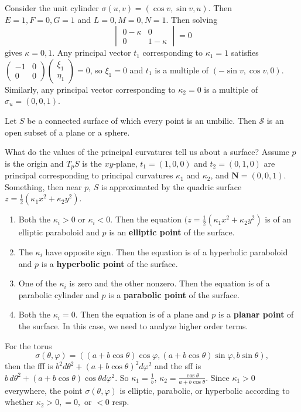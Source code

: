 \begin{example}
    Consider the unit cylinder $\sigma(u,v)=(\cos v, \sin v, u)$. Then $E=1,F=0,G=1$ and  $L=0,M=0,N=1$. Then solving \[
    \begin{vmatrix}
        0-\kappa & 0 \\ 0 & 1-\kappa
    \end{vmatrix}=0
\] gives $\kappa=0,1$. Any principal vector $t_1$ corresponding to $\kappa_1=1$ satisfies $\left( 
\begin{smallmatrix}
    -1 & 0 \\ 0 & 0
\end{smallmatrix}\right) \left( 
\begin{smallmatrix}
    \xi_1 \\ \eta_1
\end{smallmatrix}\right) =0$, so $\xi_1=0$ and $t_1$ is a multiple of $(-\sin v, \cos v, 0)$. Similarly, any principal vector corresponding to $\kappa_2=0$ is a multiple of $\sigma_u=(0,0,1)$. 
\end{example}
\begin{prop}
    Let $S$ be a connected surface of which every point is an umbilic. Then $\mathcal{S} $ is an open subset of a plane or a sphere.
\end{prop}
What do the values of the principal curvatures tell us about a surface? Assume $p$ is the origin and $T_p S$ is the $xy$-plane, $t_1=(1,0,0)$ and $t_2=(0,1,0)$ are principal corresponding to principal curvatures $\kappa_1$ and $\kappa_2$, and $\mathbf N=(0,0,1)$. Something, then near $p$, $S$ is approximated by the quadric surface $z= \frac{1}{2}(\kappa_1 x^2+\kappa_2 y^2)$.
\begin{enumerate}[label=(\roman*)]
\setlength\itemsep{-.2em}
    \item Both the $\kappa_i >0$ or $\kappa_i <0$. Then the equation $(z=\frac{1}{2}(\kappa_1x^2+\kappa_2y^2)$ is of an elliptic paraboloid and $p$ is an \textbf{elliptic point} of the surface.
    \item The $\kappa_i $ have opposite sign. Then the equation is of a hyperbolic paraboloid and $p$ is a \textbf{hyperbolic point} of the surface.
    \item One of the $\kappa_i $ is zero and the other nonzero. Then the equation is of a parabolic cylinder and $p$ is a \textbf{parabolic point} of the surface.
    \item Both the $\kappa_i =0$. Then the equation is of a plane and $p$ is a \textbf{planar point} of the surface. In this case, we need to analyze higher order terms.
\end{enumerate}
\begin{example}
    For the torus \[
        \sigma(\theta,\varphi )=((a+b \cos \theta) \cos \varphi , (a+b \cos \theta) \sin \varphi , b \sin \theta),
    \] then the fff is $b^2 d \theta ^2+(a+b \cos \theta)^2 d \varphi  ^2$ and the sff is $b\, d \theta ^2+(a+b \cos \theta) \cos \theta d \varphi ^2$. So $\kappa_1= \frac{1}{b}$, $\kappa_2= \frac{\cos \theta}{a +b \cos\theta}$. Since $\kappa_1>0$ everywhere, the point $\sigma(\theta, \varphi )$ is elliptic, parabolic, or hyperbolic according to whether $\kappa_2>0,=0,$ or $<0$ resp.
\end{example}

